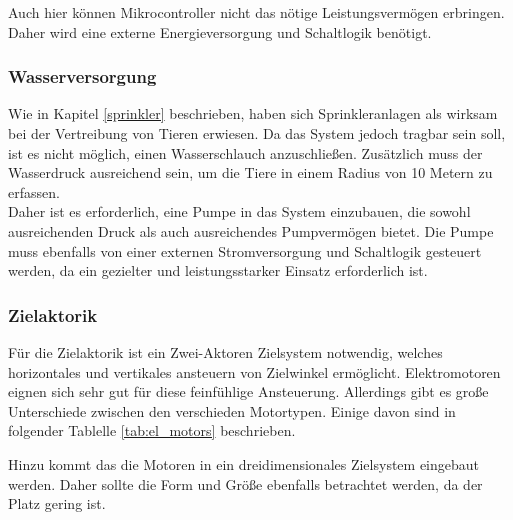 Auch hier können Mikrocontroller nicht das nötige Leistungsvermögen erbringen. Daher wird eine externe Energieversorgung und Schaltlogik benötigt.

\subsubsection{Wasserversorgung}

Wie in Kapitel \ref{sprinkler} beschrieben, haben sich Sprinkleranlagen als wirksam bei der Vertreibung von Tieren erwiesen. Da das System jedoch tragbar sein soll, ist es nicht möglich, einen Wasserschlauch anzuschließen. Zusätzlich muss der Wasserdruck ausreichend sein, um die Tiere in einem Radius von 10 Metern zu erfassen.
\\
Daher ist es erforderlich, eine Pumpe in das System einzubauen, die sowohl ausreichenden Druck als auch ausreichendes Pumpvermögen bietet. Die Pumpe muss ebenfalls von einer externen Stromversorgung und Schaltlogik gesteuert werden, da ein gezielter und leistungsstarker Einsatz erforderlich ist.

\subsubsection{Zielaktorik}

Für die Zielaktorik ist ein Zwei-Aktoren Zielsystem notwendig, welches horizontales und vertikales ansteuern von Zielwinkel ermöglicht. Elektromotoren eignen sich sehr gut für diese feinfühlige Ansteuerung. Allerdings gibt es große Unterschiede zwischen den verschieden Motortypen. Einige davon sind in folgender Tablelle \ref{tab:el_motors} beschrieben.

Hinzu kommt das die Motoren in ein dreidimensionales Zielsystem eingebaut werden. Daher sollte die Form und Größe ebenfalls betrachtet werden, da der Platz gering ist.

